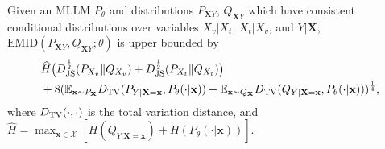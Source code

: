 \begin{corollary}\label{thm:emid_bound_simple_v2} 
 Given an MLLM $P_{\theta}$ and distributions $P_{\mathbf{X}Y}$, $Q_{\mathbf{X}Y}$ which have consistent conditional distributions over variables $X_{v}|X_{t}$, $X_{t}|X_{v}$, and $Y|\mathbf{X}$, $\text{EMID}(P_{\mathbf{X}Y},Q_{\mathbf{X}Y};\theta)$ is upper bounded by
\begin{equation} \label{eq:emid_bound_simple_v2}
    \begin{split}
     &\widehat{H}\big( { D^{\frac{1}{2}}_{\rm JS}(P_{X_{v}}\|Q_{X_{v}})} + {D^{\frac{1}{2}}_{\rm JS}(P_{X_{t}}\|Q_{X_{t}})} \big) \\
     &+ 8(\mathbb{E}_{\mathbf{x}\sim P_{\mathbf{X}}} D_{\rm TV}(P_{Y|\mathbf{X}=\mathbf{x}},P_{\theta}(\cdot|\mathbf{x})) + \mathbb{E}_{\mathbf{x}\sim Q_{\mathbf{X}}} D_{\rm TV}(Q_{Y|\mathbf{X}=\mathbf{x}},P_{\theta}(\cdot|\mathbf{x})))^{\frac{1}{4}},
    \end{split}
\end{equation}
where $D_{\rm TV}(\cdot,\cdot)$ is the total variation distance, and $ \widehat{H}=\max_{\mathbf{x}\in\mathcal{X}} [H(Q_{Y|\mathbf{X}=\mathbf{x}})+H(P_{\theta}(\cdot|\mathbf{x}))]$.
\end{corollary}

